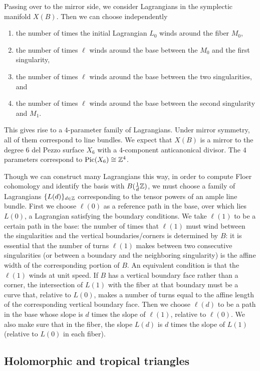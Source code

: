 \documentclass[12pt]{amsart}
\begin{document}
Passing over to the mirror side, we consider Lagrangians in the symplectic manifold $X(B)$. Then we can choose independently
\begin{enumerate}
\item the number of times the initial Lagrangian $L_0$ winds around
  the fiber $M_0$,
\item the number of times $\ell$ winds around the base between the
  $M_0$ and the first singularity,
\item the number of times $\ell$ winds around the base between the two
  singularities, and
\item the number of times $\ell$ winds around the base between the
  second singularity and $M_1$.
\end{enumerate}
This gives rise to a $4$-parameter family of Lagrangians. Under mirror
symmetry, all of them correspond to line bundles. We expect that
$X(B)$ is a mirror to the degree $6$ del Pezzo surface $X_6$ with a
$4$-component anticanonical divisor. The $4$ parameters correspond to
$\operatorname{Pic}(X_6) \cong \mathbb{Z}^4$. 

Though we can construct many Lagrangians this way, in order to compute
Floer cohomology and identify the basis with $B(\frac{1}{d}\mathbb{Z})$, we
must choose a family of Lagrangians $\{L(d)\}_{d\in\mathbb{Z}}$ corresponding
to the tensor powers of an ample line bundle. First we choose $\ell(0)$ as a
reference path in the base, over which lies $L(0)$, a Lagrangian
satisfying the boundary conditions. We take $\ell(1)$ to be a certain
path in the base: the number of times that $\ell(1)$ must wind between
the singularities and the vertical boundaries/corners is determined by
$B$: it is essential that the number of turns $\ell(1)$ makes between
two consecutive singularities (or between a boundary and the
neighboring singularity) is the affine width of the corresponding
portion of $B$. An equivalent condition is that the $\ell(1)$ winds at
unit speed. If $B$ has a vertical boundary face rather than a corner,
the intersection of $L(1)$ with the fiber at that boundary must be a
curve that, relative to $L(0)$, makes a number of turns equal to the
affine length of the corresponding vertical boundary face. Then we
choose $\ell(d)$ to be a path in the base whose slope is $d$ times the
slope of $\ell(1)$, relative to $\ell(0)$. We also make sure that in
the fiber, the slope $L(d)$ is $d$ times the slope of $L(1)$ (relative
to $L(0)$ in each fiber).

\subsection{Holomorphic and tropical triangles}
\label{sec:other-triangles}
\end{document}
